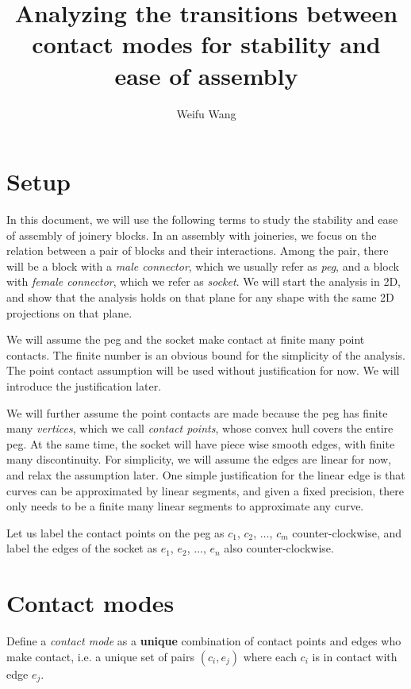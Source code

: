 \documentclass[11p]{article}
\title{Analyzing the transitions between contact modes for stability and ease of assembly}
\author{Weifu Wang}
\date{}
\begin{document}
\maketitle

\section{Setup}

In this document, we will use the following terms to study the stability and ease of assembly of joinery blocks. In an assembly with joineries, we focus on the relation between a pair of blocks and their interactions. Among the pair, there will be a block with a {\em male connector}, which we usually refer as {\em peg}, and a block with {\em female connector}, which we refer as {\em socket}. We will start the analysis in 2D, and show that the analysis holds on that plane for any shape with the same 2D projections on that plane. 

We will assume the peg and the socket make contact at finite many point contacts. The finite number is an obvious bound for the simplicity of the analysis. The point contact assumption will be used without justification for now. We will introduce the justification later. 

We will further assume the point contacts are made because the peg has finite many {\em vertices}, which we call {\em contact points}, whose convex hull covers the entire peg. At the same time, the socket will have piece wise smooth edges, with finite many discontinuity. For simplicity, we will assume the edges are linear for now, and relax the assumption later. One simple justification for the linear edge is that curves can be approximated by linear segments, and given a fixed precision, there only needs to be a finite many linear segments to approximate any curve. 

Let us label the contact points on the peg as $c_1$, $c_2$, $\ldots$, $c_m$ counter-clockwise, and label the edges of the socket as $e_1$, $e_2$, $\ldots$, $e_n$ also counter-clockwise. 



\section{Contact modes}

Define a {\em contact mode} as a {\bf unique} combination of contact points and edges who make contact, i.e. a unique set of pairs $(c_i, e_j)$ where each $c_i$ is in contact with edge $e_j$. 
\end{document}
